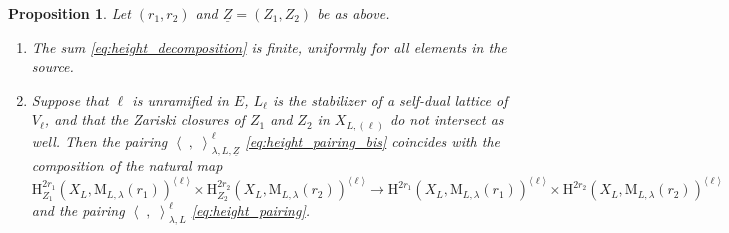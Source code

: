 \documentclass[12pt]{amsart}
\numberwithin{equation}{section}
\theoremstyle{plain}
\newtheorem{proposition}{Proposition}[section]
\theoremstyle{definition}
\theoremstyle{remark}
\renewcommand{\r}[1]{\mathrm{#1}}
\renewcommand{\(}{\left(}
\renewcommand{\)}{\right)}
\newcommand{\ang}[1]{\langle{#1}\rangle}
\newcommand{\ul}{\underline}
\newcommand{\rH}{\r H}
\newcommand{\rM}{\r M}
\newcommand{\llangle}{\left\langle}
\newcommand{\rrangle}{\right\rangle}
\begin{document}
\begin{proposition}\label{pr:height_decomposition}
Let $(r_1,r_2)$ and $\ul{Z}=(Z_1,Z_2)$ be as above.
\begin{enumerate}
  \item The sum \eqref{eq:height_decomposition} is finite, uniformly for all elements in the source.

  \item Suppose that $\ell$ is unramified in $E$, $L_\ell$ is the stabilizer of a self-dual lattice of $V_\ell$, and that the Zariski closures of $Z_1$ and $Z_2$ in $X_{L,(\ell)}$ do not intersect as well. Then the pairing $\llangle\;,\;\rrangle_{\lambda,L,\ul{Z}}^{\ell}$ \eqref{eq:height_pairing_bis} coincides with the composition of the natural map
      \[
      \rH^{2r_1}_{Z_1}(X_L,\rM_{L,\lambda}(r_1))^{\ang\ell}\times\rH^{2r_2}_{Z_2}(X_L,\rM_{L,\lambda}(r_2))^{\ang\ell}\to
      \rH^{2r_1}(X_L,\rM_{L,\lambda}(r_1))^{\ang\ell}\times\rH^{2r_2}(X_L,\rM_{L,\lambda}(r_2))^{\ang\ell}
      \]
      and the pairing $\llangle\;,\;\rrangle_{\lambda,L}^{\ell}$ \eqref{eq:height_pairing}.
\end{enumerate}
\end{proposition}
\end{document}
